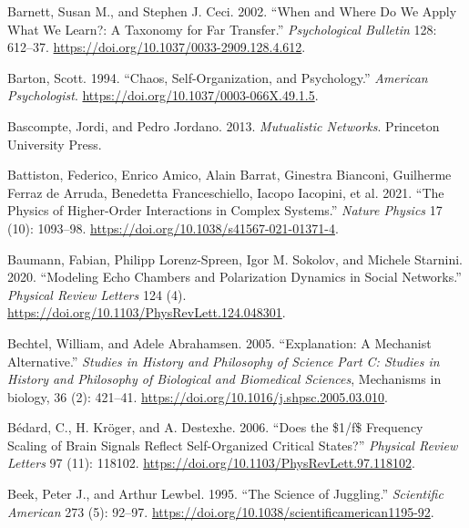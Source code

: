 \documentclass[
  a4paper,
  DIV=11,
  numbers=noendperiod,
  oneside]{scrreprt}
\newlength{\cslhangindent}
\newenvironment{CSLReferences}[2] %
 {\begin{list}{}{%
  \setlength{\itemindent}{0pt}
  \setlength{\leftmargin}{0pt}
  \setlength{\parsep}{0pt}
  \ifodd #1
   \setlength{\leftmargin}{\cslhangindent}
   \setlength{\itemindent}{-1\cslhangindent}
  \fi
  \setlength{\itemsep}{#2\baselineskip}}}
 {\end{list}}
\begin{document}
\begin{CSLReferences}{1}{0}
Barnett, Susan M., and Stephen J. Ceci. 2002. {``When and Where Do We
Apply What We Learn?: {A} Taxonomy for Far Transfer.''}
\emph{Psychological Bulletin} 128: 612--37.
\url{https://doi.org/10.1037/0033-2909.128.4.612}.

Barton, Scott. 1994. {``Chaos, {Self-Organization}, and {Psychology}.''}
\emph{American Psychologist}.
\url{https://doi.org/10.1037/0003-066X.49.1.5}.

Bascompte, Jordi, and Pedro Jordano. 2013. \emph{Mutualistic
{Networks}}. {Princeton University Press}.

Battiston, Federico, Enrico Amico, Alain Barrat, Ginestra Bianconi,
Guilherme Ferraz de Arruda, Benedetta Franceschiello, Iacopo Iacopini,
et al. 2021. {``The Physics of Higher-Order Interactions in Complex
Systems.''} \emph{Nature Physics} 17 (10): 1093--98.
\url{https://doi.org/10.1038/s41567-021-01371-4}.

Baumann, Fabian, Philipp Lorenz-Spreen, Igor M. Sokolov, and Michele
Starnini. 2020. {``Modeling {Echo Chambers} and {Polarization Dynamics}
in {Social Networks}.''} \emph{Physical Review Letters} 124 (4).
\url{https://doi.org/10.1103/PhysRevLett.124.048301}.

Bechtel, William, and Adele Abrahamsen. 2005. {``Explanation: A
Mechanist Alternative.''} \emph{Studies in History and Philosophy of
Science Part C: Studies in History and Philosophy of Biological and
Biomedical Sciences}, Mechanisms in biology, 36 (2): 421--41.
\url{https://doi.org/10.1016/j.shpsc.2005.03.010}.

Bédard, C., H. Kröger, and A. Destexhe. 2006. {``Does the \$1/f\$
{Frequency Scaling} of {Brain Signals Reflect Self-Organized Critical
States}?''} \emph{Physical Review Letters} 97 (11): 118102.
\url{https://doi.org/10.1103/PhysRevLett.97.118102}.

Beek, Peter J., and Arthur Lewbel. 1995. {``The {Science} of
{Juggling}.''} \emph{Scientific American} 273 (5): 92--97.
\url{https://doi.org/10.1038/scientificamerican1195-92}.


\end{CSLReferences}
\end{document}
